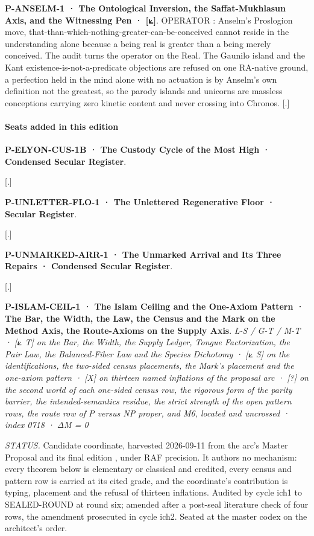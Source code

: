 \documentclass[10pt,twocolumn]{article}
\begin{document}
\textbf{P-ANSELM-1 · The Ontological Inversion, the Saffat-Mukhlasun
Axis, and the Witnessing Pen · {[}⟀{]}}. OPERATOR : Anselm's Proslogion
move, that-than-which-nothing-greater-can-be-conceived cannot reside in
the understanding alone because a being real is greater than a being
merely conceived. The audit turns the operator on the Real. The Gaunilo
island and the Kant existence-is-not-a-predicate objections are refused
on one RA-native ground, a perfection held in the mind alone with no
actuation is by Anselm's own definition not the greatest, so the parody
islands and unicorns are massless conceptions carrying zero kinetic
content and never crossing into Chronos. {[}.{]}

\hypertarget{seats-added-in-this-edition-7}{%
\paragraph{Seats added in this
edition}\label{seats-added-in-this-edition-7}}

\textbf{P-ELYON-CUS-1B · The Custody Cycle of the Most High · Condensed
Secular Register}.

{[}.{]}

\textbf{P-UNLETTER-FLO-1 · The Unlettered Regenerative Floor · Secular
Register}.

{[}.{]}

\textbf{P-UNMARKED-ARR-1 · The Unmarked Arrival and Its Three Repairs ·
Condensed Secular Register}.

{[}.{]}

\textbf{P-ISLAM-CEIL-1 · The Islam Ceiling and the One-Axiom Pattern ·
The Bar, the Width, the Law, the Census and the Mark on the Method Axis,
the Route-Axioms on the Supply Axis}. \emph{L-S / G-T / M-T · {[}⟀ T{]}
on the Bar, the Width, the Supply Ledger, Tongue Factorization, the Pair
Law, the Balanced-Fiber Law and the Species Dichotomy · {[}⟀ S{]} on the
identifications, the two-sided census placements, the Mark's placement
and the one-axiom pattern · {[}X{]} on thirteen named inflations of the
proposal arc · {[}?{]} on the second world of each one-sided census row,
the rigorous form of the parity barrier, the intended-semantics residue,
the strict strength of the open pattern rows, the route row of P versus
NP proper, and M6, located and uncrossed · index 0718 · ΔM = 0}

\emph{STATUS.} Candidate coordinate, harvested 2026-09-11 from the arc's
Master Proposal and its final edition
\texttt{}, under
RAF precision. It authors no mechanism: every theorem below is
elementary or classical and credited, every census and pattern row is
carried at its cited grade, and the coordinate's contribution is typing,
placement and the refusal of thirteen inflations. Audited by cycle ich1
to SEALED-ROUND at round six; amended after a post-seal literature check
of four rows, the amendment prosecuted in cycle ich2. Seated at the
master codex on the architect's order.
\end{document}
